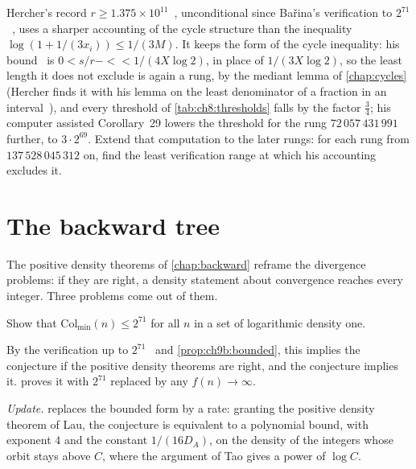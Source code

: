 \begin{problem*}\label{prob:ch11:c3}
Hercher's record $r\ge1.375\times10^{11}$~\cite[Corollary~29]{hercher2023},
unconditional since Ba\v{r}ina's verification to $2^{71}$~\cite{barina2025}, uses a sharper accounting of the
cycle structure than the inequality $\log(1+1/(3x_i))\le1/(3M)$.
It keeps the form of the cycle inequality: his bound~\cite[Theorem~27]{hercher2023} is $0<s/r-\lt<1/(4X\log2)$, in place of $1/(3X\log2)$, so the least length it does not exclude is again a rung, by the mediant lemma of \cref{chap:cycles} (Hercher finds it with his lemma on the least denominator of a fraction in an interval~\cite[Lemma~22]{hercher2023}), and every threshold of \cref{tab:ch8:thresholds} falls by the factor $\frac34$; his computer assisted Corollary~29 lowers the threshold for the rung $72\,057\,431\,991$ further, to $3\cdot2^{69}$.
Extend that computation to the later rungs: for each rung from $137\,528\,045\,312$ on, find the least verification range at which his accounting excludes it.
\end{problem*}

\section{The backward tree}\label{sec:ch11:backward}

The positive density theorems of \cref{chap:backward} reframe the divergence problems: if they are right, a density statement about convergence reaches every integer. Three problems come out of them.

\begin{problem*}\label{prob:ch11:b1}
Show that $\mathrm{Col}_{\min}(n)\le2^{71}$ for all $n$ in a set of logarithmic density one.
\end{problem*}

By the verification up to $2^{71}$~\cite{barina2025} and \cref{prop:ch9b:bounded}, this implies the conjecture if the positive density theorems are right, and the conjecture implies it.  proves it with $2^{71}$ replaced by any $f(n)\to\infty$.

\emph{Update.}  replaces the bounded form by a rate: granting the positive density theorem of Lau, the conjecture is equivalent to a polynomial bound, with exponent $4$ and the constant $1/(16D_A)$, on the density of the integers whose orbit stays above $C$, where the argument of Tao gives a power of $\log C$.

